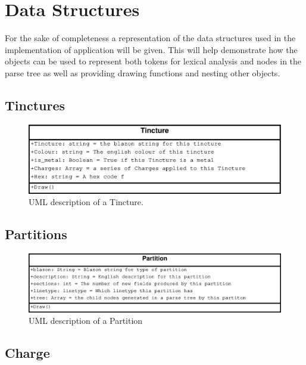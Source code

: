 \chapter{Data Structures}


For the sake of completeness a representation of the data structures used in the implementation of application will be given.  This will help demonstrate how the objects can be used to represent both tokens for lexical analysis and nodes in the parse tree as well as providing drawing functions and nesting other objects.


\section{Tinctures}

\begin{figure}[H]
  \centering
    \includegraphics[width=\textwidth]{datastructures/images/tincture.eps}
  \caption{UML description of a Tincture.\cite{linetypes}}
  \label{fig:lines}
  
\end{figure}


\section{Partitions}



\begin{figure}[H]
  \centering
    \includegraphics[width=\textwidth]{datastructures/images/partition.eps}
  \caption{UML description of a Partition\cite{linetypes}}
  \label{fig:lines}
  
\end{figure}


\section{Charge}



